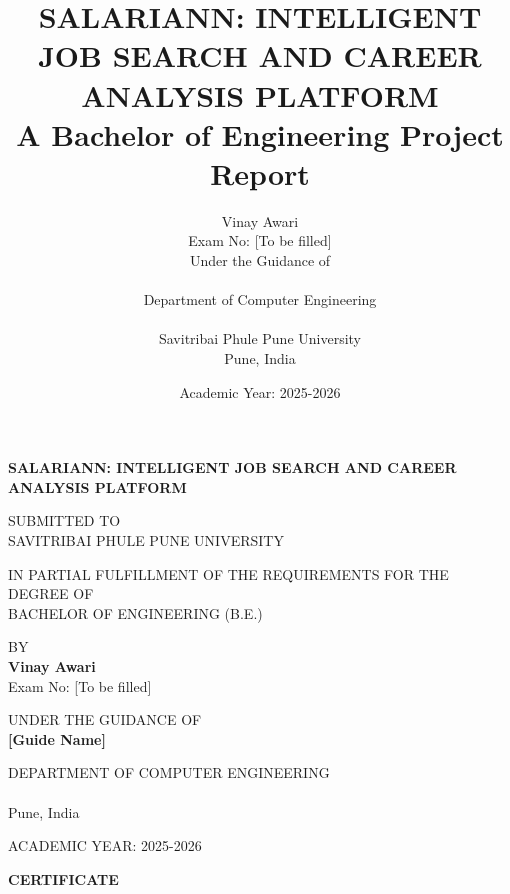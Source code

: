 \documentclass[12pt,a4paper,oneside]{report}
\title{
    \textbf{SALARIANN: INTELLIGENT JOB SEARCH AND CAREER ANALYSIS PLATFORM}\\
    \vspace{0.5cm}
    \large{A Bachelor of Engineering Project Report}
}
\author{
    Vinay Awari\\
    Exam No: [To be filled]\\
    \vspace{0.5cm}
    Under the Guidance of\\
    [Guide Name]\\
    \vspace{0.5cm}
    Department of Computer Engineering\\
    [College Name]\\
    Savitribai Phule Pune University\\
    Pune, India
}
\date{Academic Year: 2025-2026}
\begin{document}
\begin{titlepage}
    \centering
    \vspace*{1cm}
    
    \textbf{\LARGE SALARIANN: INTELLIGENT JOB SEARCH AND CAREER ANALYSIS PLATFORM}
    
    \vspace{1.5cm}
    
    \Large SUBMITTED TO\\
    SAVITRIBAI PHULE PUNE UNIVERSITY
    
    \vspace{1cm}
    
    IN PARTIAL FULFILLMENT OF THE REQUIREMENTS FOR THE DEGREE OF\\
    BACHELOR OF ENGINEERING (B.E.)
    
    \vspace{1.5cm}
    
    BY\\
    \textbf{Vinay Awari}\\
    Exam No: [To be filled]
    
    \vspace{1.5cm}
    
    UNDER THE GUIDANCE OF\\
    \textbf{[Guide Name]}
    
    \vspace{1.5cm}
    
    DEPARTMENT OF COMPUTER ENGINEERING\\
    [College Name]\\
    Pune, India
    
    \vspace{1cm}
    
    ACADEMIC YEAR: 2025-2026
    
    \vfill
\end{titlepage}

\newpage
\thispagestyle{empty}
\vspace*{2cm}

\begin{center}
    \textbf{\Large CERTIFICATE}
\end{center}
\end{document}
